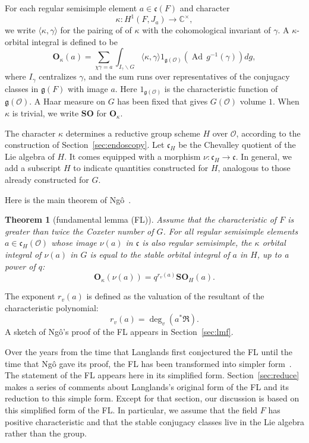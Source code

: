 \documentclass[brochure,english,12pt]{bourbaki}
\newtheorem{theorem}[equation]{Theorem}
\def\op#1{{\operatorname{#1}}}
\newcommand{\ring}[1]{\mathbb{#1}}
\def\SO{{\mathbf {SO}}}
\def\OO{{\mathbf O}}
\def\g{\mathfrak{g}}
\def\cc{\mathfrak{c}}
\def\RDIV{{\mathfrak{R}}}
\def\O{{\mathcal O}}
\begin{document}
For each regular semisimple element $a\in \cc(F)$ and character 
\[
\kappa:H^1(F,J_a)\to\ring{C}^\times,
\]
we write
 $\langle\kappa,\gamma\rangle$ for the pairing of
of $\kappa$ with the cohomological invariant of $\gamma$.
A 
$\kappa$-orbital integral is defined to be
\begin{equation}\label{eqn:k-orbital}
\OO_\kappa(a) = \sum_ {\chi\gamma= a} 
\int_{I_\gamma\backslash G} \langle\kappa,\gamma\rangle 1_{\g(\O)} (\op{Ad}\, g^{-1}(\gamma)) dg,
\end{equation}
where $I_\gamma$ centralizes $\gamma$, and the sum runs over representatives of the conjugacy
classes in $\g(F)$ with image $a$.   Here $1_{\g(\O)}$ is the
characteristic function of $\g(\O)$.  A Haar measure on $G$ has been fixed that gives $G(\O)$
volume $1$.  When $\kappa$ is trivial, we
write $\SO$ for $\OO_\kappa$.

The character $\kappa$ determines a reductive group scheme $H$ over $\O$,
according to the construction of Section~\ref{sec:endoscopy}.
  Let $\cc_H$ be the
Chevalley quotient of the Lie algebra of $H$.  It comes equipped with a morphism $\nu:\cc_H\to\cc$.
In general, we  add a subscript $H$ to indicate
quantities constructed for  $H$, analogous to those already constructed for $G$.

Here is the main theorem of Ng\^o~\cite{NBC:2010}.

\begin{theorem}[fundamental lemma (FL)]
Assume that the characteristic of $F$ is greater than twice the Coxeter number of $G$.
For all regular semisimple elements $a\in \cc_H(\O)$ whose image
$\nu(a)$ in $\cc$ is also regular semisimple, the $\kappa$ orbital integral of $\nu(a)$ in $G$ is
equal to the stable orbital integral of $a$ in $H$, up to a power of $q$:
\[
\OO_\kappa(\nu(a)) = q^{r_v(a)}\SO_H(a).
\]
\end{theorem}

The  exponent $r_v(a)$ is defined as the valuation of the resultant of the characteristic polynomial:
\[
r_v(a) = \deg_v(a^*\RDIV).
\]
A sketch of Ng\^o's proof of the FL  appears in Section~\ref{sec:lmf}. 


Over the years from the time that Langlands first conjectured the FL
until the time that Ng\^o gave its proof, the FL has been transformed
into simpler form~\cite{Langlands:debuts}.  The statement of the FL appears here in its
simplified form.  Section~\ref{sec:reduce} makes a series of comments
about Langlands's original form of the FL and its reduction
to this simple form.  Except for that section, our discussion is based
on this simplified form of the FL.  In particular, we assume that the
field $F$ has positive characteristic and that the stable conjugacy
classes live in the Lie algebra rather than the group.
\end{document}
